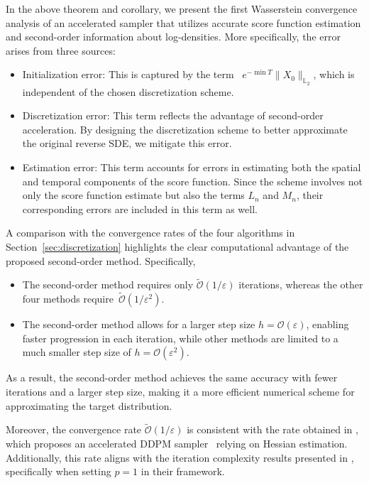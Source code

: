\documentclass[11pt]{article}
\def\Ltwo{\mathbb L_2}
\begin{document}
{
In the above theorem and corollary, we present the first Wasserstein convergence analysis of an accelerated sampler that utilizes accurate score function estimation and second-order information about log-densities.
More specifically, the error arises from three sources:
\begin{itemize}
    \item Initialization error: This is captured by the term ~$e^{-\min T}\|X_0\|_{\Ltwo}$,  which is independent of the chosen discretization scheme.
    \item Discretization error: This term reflects the advantage of second-order acceleration. By designing the discretization scheme to better approximate the original reverse SDE, we mitigate this error.
    \item Estimation error: This term accounts for errors in estimating both the spatial and temporal components of the score function. Since the scheme involves not only the score function estimate but also the terms $L_n$ and $M_n$, their corresponding errors are included in this term as well.
\end{itemize}
}


A comparison with the convergence rates of the four algorithms in Section~\ref{sec:discretization} highlights the clear computational advantage of the proposed second-order method.
Specifically,
\begin{itemize}
\setlength\itemsep{0.02em}
    \item The second-order method requires only $\widetilde{\mathcal{O}}(1/\varepsilon)$ iterations, whereas the other four methods require~$\widetilde{\mathcal{O}}(1/\varepsilon^2)$.
    \item The second-order method allows for a larger step size $h=\mathcal{O}(\varepsilon)$, enabling faster progression in each iteration, while other methods are limited to a much smaller step size of $h=\mathcal{O}(\varepsilon^2)$.
\end{itemize}
As a result, the second-order method achieves the same accuracy with fewer iterations and a larger step size, making it a more efficient numerical scheme for approximating the target distribution.

Moreover, the convergence rate $\widetilde{\mathcal{O}}(1/\varepsilon)$ is consistent with the rate obtained in \cite{liang2024broadening}, which proposes an accelerated DDPM sampler~\cite{ho2020denoising} relying on Hessian estimation. Additionally, this rate aligns with the iteration complexity results presented in \cite{huang2024convergence}, specifically when setting $p=1$ in their framework.
\end{document}
